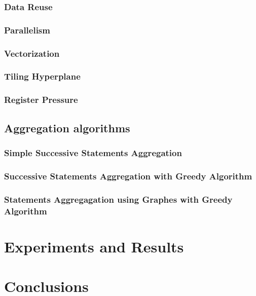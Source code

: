 \documentclass[paper=a4, fontsize=11pt]{scrartcl}
\numberwithin{equation}{section}        %
\numberwithin{figure}{section}          %
\numberwithin{table}{section}               %
\begin{document}
        \subsubsection{Data Reuse}
        \subsubsection{Parallelism}
        \subsubsection{Vectorization}
        \subsubsection{Tiling Hyperplane}
        \subsubsection{Register Pressure}
    \subsection{Aggregation algorithms}
        \subsubsection{Simple Successive Statements Aggregation}
        \subsubsection{Successive Statements Aggregation with Greedy Algorithm}
        \subsubsection{Statements Aggregagation using Graphes with Greedy Algorithm}

\section{Experiments and Results}

\section{Conclusions}




\end{document}
